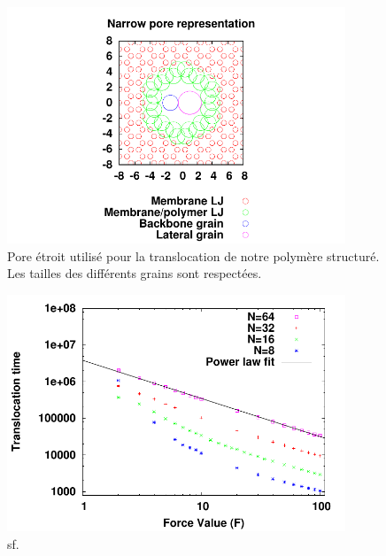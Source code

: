 \begin{figure}[H]
\begin{center}
\includegraphics[width=0.9\textwidth]{thinpore.pdf}


\caption[Polymère structuré et pore étroit]{Pore étroit utilisé pour la translocation de notre polymère structuré. Les tailles des différents grains sont respectées. }
\label{porethin}

\end{center}
\end{figure}

\begin{figure}[H]
\begin{center}
\includegraphics[width=0.9\textwidth]{sptransloc.pdf}
\caption[Temps de translocation du polymère structuré avec un pore étroit]{sf.}
\label{sptransloc}
\end{center}
\end{figure}

